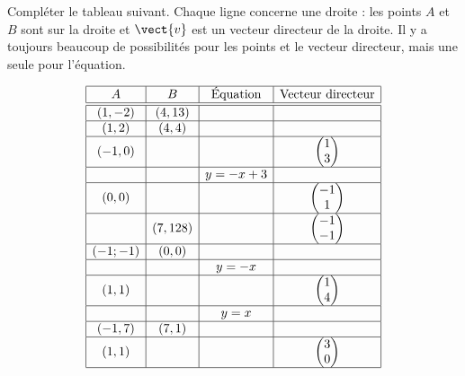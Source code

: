 
\begin{exercice}\label{exosmath-0155}

    Compléter le tableau suivant. Chaque ligne concerne une droite : les points \( A\) et \( B\) sont sur la droite et \( \vect{ v }\) est un vecteur directeur de la droite. Il y a toujours beaucoup de possibilités pour les points et le vecteur directeur, mais une seule pour l'équation.

    \begin{equation*}
        \begin{array}[]{|c|c|c|c|}
            \hline
            A&B&\text{Équation}&\text{Vecteur directeur}\\
            \hline\hline
            (1,-2)&(4,13)&&\\
            \hline
            (1,2)&(4,4)&&\\
            \hline
            (-1,0)&&&\begin{pmatrix}
                1    \\ 
                3    
            \end{pmatrix}\\
            \hline
            &&y=-x+3&\\
            \hline
            (0,0)&&&\begin{pmatrix}
                -1    \\ 
                1    
            \end{pmatrix}\\
            \hline
            &(7,128)&&\begin{pmatrix}
                -1    \\ 
                -1    
            \end{pmatrix}\\
            \hline
            (-1;-1)&(0,0)&&\\
            \hline
            &&y=-x&\\
            \hline
            (1,1)&&&\begin{pmatrix}
                1    \\ 
                4    
            \end{pmatrix}\\
            \hline
            &&y=x&\\
            \hline
            (-1,7)&(7,1)&&\\
            \hline
            (1,1)&&&\begin{pmatrix}
                3    \\ 
                0    
            \end{pmatrix}\\
            \hline
        \end{array}
    \end{equation*}

\end{exercice}
